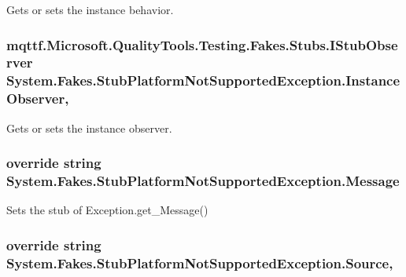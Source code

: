 Gets or sets the instance behavior.

\hypertarget{class_system_1_1_fakes_1_1_stub_platform_not_supported_exception_af11f800190610567245061484075711f}{
\subsubsection[{Instance\-Observer}]{\setlength{\rightskip}{0pt plus 5cm}mqttf.\-Microsoft.\-Quality\-Tools.\-Testing.\-Fakes.\-Stubs.\-I\-Stub\-Observer System.\-Fakes.\-Stub\-Platform\-Not\-Supported\-Exception.\-Instance\-Observer\hspace{0.3cm}{\ttfamily [get]}, {\ttfamily [set]}}}\label{class_system_1_1_fakes_1_1_stub_platform_not_supported_exception_af11f800190610567245061484075711f}


Gets or sets the instance observer.

\hypertarget{class_system_1_1_fakes_1_1_stub_platform_not_supported_exception_aea7b0edbcaa705f27b2ffe7993d67b57}{
\subsubsection[{Message}]{\setlength{\rightskip}{0pt plus 5cm}override string System.\-Fakes.\-Stub\-Platform\-Not\-Supported\-Exception.\-Message\hspace{0.3cm}{\ttfamily [get]}}}\label{class_system_1_1_fakes_1_1_stub_platform_not_supported_exception_aea7b0edbcaa705f27b2ffe7993d67b57}


Sets the stub of Exception.\-get\-\_\-\-Message()

\hypertarget{class_system_1_1_fakes_1_1_stub_platform_not_supported_exception_a10c3402c4ef61786b4d0824a8fc7f87e}{
\subsubsection[{Source}]{\setlength{\rightskip}{0pt plus 5cm}override string System.\-Fakes.\-Stub\-Platform\-Not\-Supported\-Exception.\-Source\hspace{0.3cm}{\ttfamily [get]}, {\ttfamily [set]}}}\label{class_system_1_1_fakes_1_1_stub_platform_not_supported_exception_a10c3402c4ef61786b4d0824a8fc7f87e}


